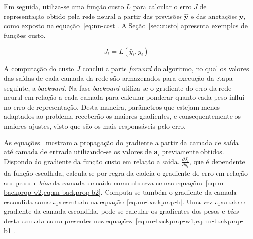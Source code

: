Em seguida, utiliza-se uma função custo $L$ para calcular o erro $J$ de representação obtido pela rede neural a partir
das previsões $\mathbf{\hat{y}}$ e das anotações $\mathbf{y}$, como exposto na equação~\ref{eq:nn-cost}.
A Seção~\ref{sec:custo} apresenta exemplos de funções custo.

\begin{equation} \label{eq:nn-cost}
    J_i = L(\hat{y}_i, y_i)
\end{equation}

A computação do custo $J$ conclui a parte \textit{forward} do algoritmo, no qual os valores das saídas de cada camada da
rede são armazenados para execução da etapa seguinte, a \textit{backward}.
Na fase \textit{backward} utiliza-se o gradiente do erro da rede neural em relação a cada camada para calcular ponderar
quanto cada peso influi no erro de representação.
Desta maneira, parâmetros que estejam menos adaptados ao problema receberão os maiores gradientes, e consequentemente os
maiores ajustes, visto que são os mais responsáveis pelo erro.

As equações~ mostram a propagação do gradiente a partir da camada de
saída até camada de entrada utilizando-se os valores de $\mathbf{a}_i$ previamente obtidos.
Dispondo do gradiente da função custo em relação a saída, $\frac{\partial{J_i}}{\partial{y_i}}$, que é dependente da
função escolhida, calcula-se por regra da cadeia o gradiente do erro em relação aos pesos e \textit{bias} da camada de
saída como observa-se nas equações~\cref{eq:nn-backprop-w2,eq:nn-backprop-b2}.
Computa-se também o gradiente da camada escondida como apresentado na equação~\ref{eq:nn-backprop-h}.
Uma vez apurado o gradiente da camada escondida, pode-se calcular os gradientes dos pesos e \textit{bias} desta camada
como presentes nas equações~\cref{eq:nn-backprop-w1,eq:nn-backprop-b1}.

